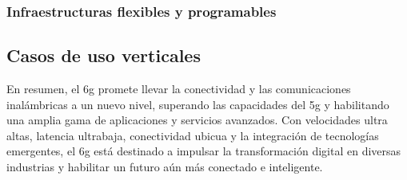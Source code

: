 \subsubsection{Infraestructuras flexibles y programables }




\subsection{Casos de uso verticales}



En resumen, el \gls{6g} promete llevar la conectividad y las comunicaciones inalámbricas a un nuevo nivel, superando las capacidades del \gls{5g} y habilitando una amplia gama de aplicaciones y servicios avanzados. Con velocidades ultra altas, latencia ultrabaja, conectividad ubicua y la integración de tecnologías emergentes, el \gls{6g} está destinado a impulsar la transformación digital en diversas industrias y habilitar un futuro aún más conectado e inteligente.

